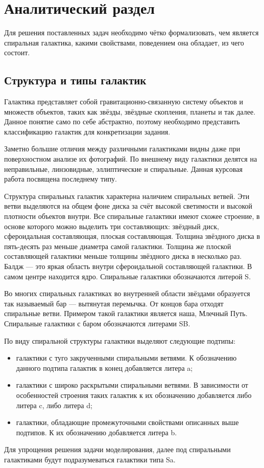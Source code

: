 \chapter{Аналитический раздел}
\label{cha:analysis}

Для решения поставленных задач необходимо чётко формализовать, чем является спиральная галактика, какими свойствами, поведением она обладает, из чего состоит.

\section{Структура и типы галактик}

Галактика представляет собой гравитационно-связанную систему объектов и множеств объектов, таких как звёзды, звёздные скопления, планеты и так далее. Данное понятие само по себе абстрактно, поэтому необходимо представить классификацию галактик для конкретизации задания.

Заметно большие отличия между различными галактиками видны даже при поверхностном анализе их фотографий. По внешнему виду галактики делятся на неправильные, линзовидные, эллиптические и спиральные\cite{konon}. Данная курсовая работа посвящена последнему типу.

Структура спиральных галактик характерна наличием спиральных ветвей. Эти ветви выделяются на общем фоне диска за счёт высокой светимости и высокой плотности объектов внутри. Все спиральные галактики имеют схожее строение, в основе которого можно выделить три составляющих: звёздный диск, сфероидальная составляющая, плоская составляющая. Толщина звёздного диска в пять-десять раз меньше диаметра самой галактики. Толщина же плоской составляющей галактики меньше толщины звёздного диска в несколько раз. Балдж — это яркая область внутри сфероидальной составляющей галактики. В самом центре находится ядро. Спиральные галактики обозначаются литерой S\cite{konon}.

Во многих спиральных галактиках во внутренней области звёздами образуется так называемый бар — вытянутая перемычка. От концов бара отходят спиральные ветви. Примером такой галактики является наша, Млечный Путь. Спиральные галактики с баром обозначаются литерами SB.

По виду спиральной структуры галактики выделяют следующие подтипы:
\begin{itemize}
    \item галактики с туго закрученными спиральными ветвями. К обозначению данного подтипа галактик в конец добавляется литера a;
    \item галактики с широко раскрытыми спиральными ветвями. В зависимости от особенностей строения таких галактик к их обозначению добавляется либо литера c, либо литера d;
    \item галактики, обладающие промежуточными свойствами описанных выше подтипов. К их обозначению добавляется литера b.
\end{itemize}
Для упрощения решения задачи моделирования, далее под спиральными галактиками будут подразумеваться галактики типа Sa.

